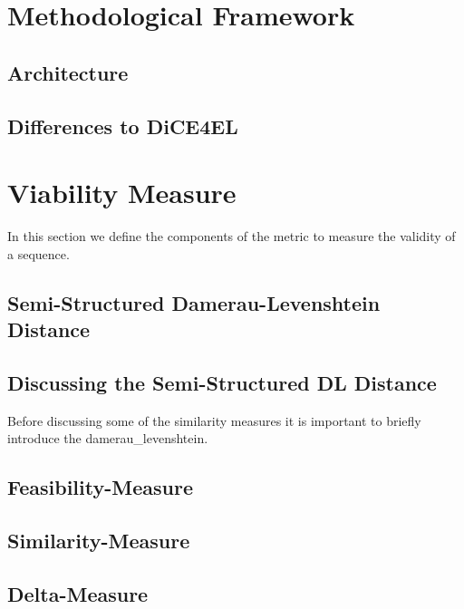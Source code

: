 \documentclass[12pt,a4paper]{report}
\begin{document}
\section{Methodological Framework}
\label{sec:framework}
\subsection{Architecture}


\subsection{Differences to DiCE4EL}



\section{Viability Measure}
\label{sec:viability}
In this section we define the components of the metric to measure the validity of a sequence.
\subsection{Semi-Structured Damerau-Levenshtein Distance}
\label{sec:ssdld}



\subsection{Discussing the Semi-Structured DL Distance}
Before discussing some of the similarity measures it is important to briefly introduce the \gls{damerau_levenshtein}.


\subsection{Feasibility-Measure}


\subsection{Similarity-Measure}


\subsection{Delta-Measure}

\end{document}
